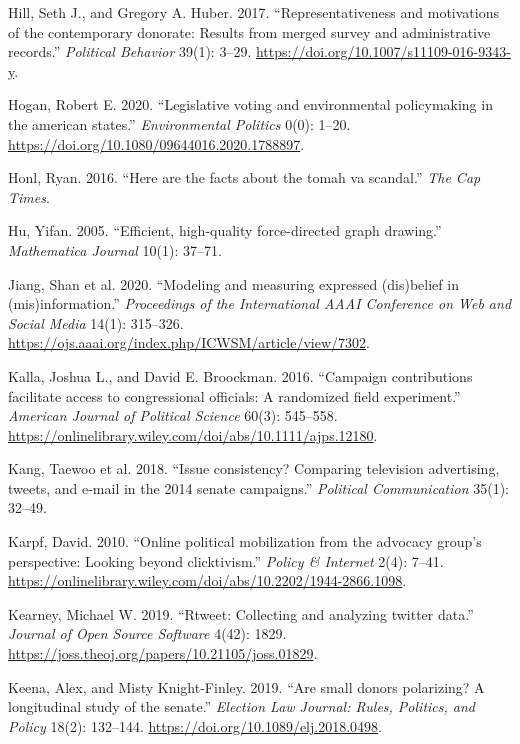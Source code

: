 \documentclass[12pt,]{article}
\begin{document}
\leavevmode\hypertarget{ref-hill2017}{}%
Hill, Seth J., and Gregory A. Huber. 2017. ``Representativeness and
motivations of the contemporary donorate: Results from merged survey and
administrative records.'' \emph{Political Behavior} 39(1): 3--29.
\url{https://doi.org/10.1007/s11109-016-9343-y}.

\leavevmode\hypertarget{ref-hogan2020}{}%
Hogan, Robert E. 2020. ``Legislative voting and environmental
policymaking in the american states.'' \emph{Environmental Politics}
0(0): 1--20. \url{https://doi.org/10.1080/09644016.2020.1788897}.

\leavevmode\hypertarget{ref-honl2016}{}%
Honl, Ryan. 2016. ``Here are the facts about the tomah va scandal.''
\emph{The Cap Times}.

\leavevmode\hypertarget{ref-yifanhu}{}%
Hu, Yifan. 2005. ``Efficient, high-quality force-directed graph
drawing.'' \emph{Mathematica Journal} 10(1): 37--71.

\leavevmode\hypertarget{ref-jiang2020}{}%
Jiang, Shan et al. 2020. ``Modeling and measuring expressed (dis)belief
in (mis)information.'' \emph{Proceedings of the International AAAI
Conference on Web and Social Media} 14(1): 315--326.
\url{https://ojs.aaai.org/index.php/ICWSM/article/view/7302}.

\leavevmode\hypertarget{ref-kalla2016}{}%
Kalla, Joshua L., and David E. Broockman. 2016. ``Campaign contributions
facilitate access to congressional officials: A randomized field
experiment.'' \emph{American Journal of Political Science} 60(3):
545--558.
\url{https://onlinelibrary.wiley.com/doi/abs/10.1111/ajps.12180}.

\leavevmode\hypertarget{ref-kang2018}{}%
Kang, Taewoo et al. 2018. ``Issue consistency? Comparing television
advertising, tweets, and e-mail in the 2014 senate campaigns.''
\emph{Political Communication} 35(1): 32--49.

\leavevmode\hypertarget{ref-karpf2010}{}%
Karpf, David. 2010. ``Online political mobilization from the advocacy
group's perspective: Looking beyond clicktivism.'' \emph{Policy \&
Internet} 2(4): 7--41.
\url{https://onlinelibrary.wiley.com/doi/abs/10.2202/1944-2866.1098}.

\leavevmode\hypertarget{ref-rtweet}{}%
Kearney, Michael W. 2019. ``Rtweet: Collecting and analyzing twitter
data.'' \emph{Journal of Open Source Software} 4(42): 1829.
\url{https://joss.theoj.org/papers/10.21105/joss.01829}.

\leavevmode\hypertarget{ref-keena2019}{}%
Keena, Alex, and Misty Knight-Finley. 2019. ``Are small donors
polarizing? A longitudinal study of the senate.'' \emph{Election Law
Journal: Rules, Politics, and Policy} 18(2): 132--144.
\url{https://doi.org/10.1089/elj.2018.0498}.
\end{document}
